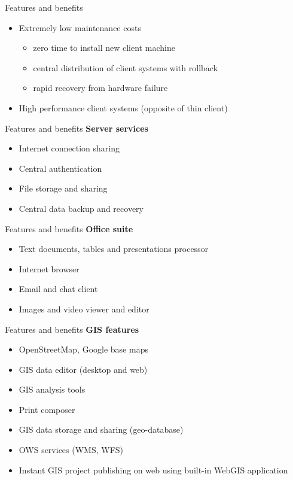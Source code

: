 \documentclass[12pt]{beamer}
\begin{document}
\begin{frame}{Features and benefits}
	\begin{itemize}
		\item Extremely low maintenance costs
		\begin{itemize}
			\item zero time to install new client machine
			\item central distribution of client systems with rollback
			\item rapid recovery from hardware failure
		\end{itemize}
		\item High performance client systems (opposite of thin client)
	\end{itemize}
\end{frame}


\begin{frame}{Features and benefits}
	\textbf{Server services}
	\begin{itemize}
		\item Internet connection sharing
		\item Central authentication
		\item File storage and sharing
		\item Central data backup and recovery
	\end{itemize}
\end{frame}


\begin{frame}{Features and benefits}
	\textbf{Office suite}
	\begin{itemize}
		\item Text documents, tables and presentations processor
		\item Internet browser
		\item Email and chat client
		\item Images and video viewer and editor
	\end{itemize}
\end{frame}


\begin{frame}{Features and benefits}
	\textbf{GIS features}
	\begin{itemize}
		\item OpenStreetMap, Google base maps
		\item GIS data editor (desktop and web)
		\item GIS analysis tools
		\item Print composer
		\item GIS data storage and sharing (geo-database)
		\item OWS services (WMS, WFS)
		\item Instant GIS project publishing on web using built-in WebGIS application
	\end{itemize}
\end{frame}
\end{document}
